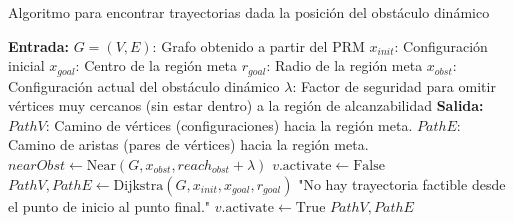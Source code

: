 \documentclass[spanish,mexico]{article}
\numberwithin{equation}{section}
\theoremstyle{definition}
\theoremstyle{remark}
\begin{document}
\begin{algorithm}[h!]
\caption{Algoritmo para encontrar trayectorias dada la posición del obstáculo dinámico}
\begin{algorithmic}[1]
\State \textbf{Entrada:} 
\State \hspace{\algorithmicindent} $G = (V, E)$: Grafo obtenido a partir del PRM
\State \hspace{\algorithmicindent} $x_{init}$: Configuración inicial
\State \hspace{\algorithmicindent} $x_{goal}$: Centro de la región meta
\State \hspace{\algorithmicindent} $r_{goal}$: Radio de la región meta
\State \hspace{\algorithmicindent} $x_{obst}$: Configuración actual del obstáculo dinámico
\State \hspace{\algorithmicindent} $\lambda$: Factor de seguridad para omitir vértices muy cercanos (sin estar dentro) a la región de alcanzabilidad
\State \textbf{Salida:} 
\State \hspace{\algorithmicindent} $PathV$: Camino de vértices (configuraciones) hacia la región meta.  
\State \hspace{\algorithmicindent} $PathE$: Camino de aristas (pares de vértices) hacia la región meta.
\vspace{3.5mm}
	\State $nearObst \gets \text{Near}(G, x_{obst}, reach_{obst} + \lambda)$
    \vspace{1.5mm}
            \State $v.\text{activate} \gets \text{False}$
        \EndIf
    \EndFor
    \vspace{1.5mm}
    \State $PathV, PathE \gets \text{Dijkstra}(G, x_{init}, x_{goal}, r_{goal})$
    \vspace{1.5mm}
        \State {} "No hay trayectoria factible desde el punto de inicio al punto final."
    \EndIf
    \vspace{1.5mm}
        \State $v.\text{activate} \gets \text{True}$
    \EndFor
    \vspace{1.5mm}
    \State \Return $PathV, PathE$
\EndFunction
\end{algorithmic}
\end{algorithm}
\end{document}
